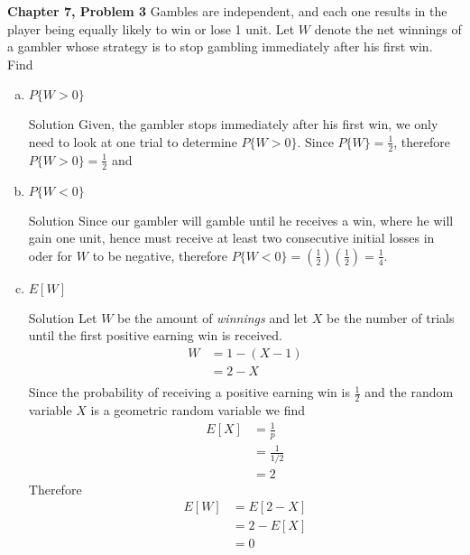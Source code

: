 \documentclass{article}
\begin{document}
\begin{spacing}{1.1}
\maketitle

\newpage
\begin{homeworkProblem}
  {\bf Chapter 7, Problem 3}
  Gambles are independent, and each one results in
  the player being equally likely to win or lose 1 unit. 
  Let $W$ denote the net winnings of a gambler whose strategy 
  is to stop gambling immediately after his first win. Find
  \begin{enumerate}[(a)]
    \item $P\{ W > 0 \}$
      \begin{homeworkSection}{Solution}
        Given, the gambler stops immediately after his
        first win, we only need to look at one trial to determine $P\{ W > 0 \}$.
        Since $P\{ W\} = \frac{ 1}{ 2}$, therefore $P\{ W > 0\} = \frac{ 1}{ 2}$ and 
      \end{homeworkSection}
    \item $P\{ W < 0 \}$
      \begin{homeworkSection}{Solution}
        Since our gambler will gamble until he receives a win, where he will gain
        one unit, hence must receive at least two consecutive initial losses in
        oder for $W$ to be negative, therefore
        $P\{ W < 0 \} = \left(\frac{ 1}{ 2}\right)\left(\frac{ 1}{ 2}\right) = \frac{ 1}{ 4}$.
      \end{homeworkSection}
    \item $E[ W]$
      \begin{homeworkSection}{Solution}
        Let $W$ be the amount of \emph{winnings} and let $X$ be the number of trials until the
        first positive earning win is received.
        \begin{align*}
          W &= 1 - (X - 1)\\
          &= 2 - X\\
        \end{align*}
        Since the probability of receiving a positive earning win is $\frac{ 1}{ 2}$ and the
        random variable $X$ is a geometric random variable we find
        \begin{align*}
          E[ X] &= \frac{ 1}{ p}\\ 
          &= \frac{ 1}{ 1/2} \\
          &= 2
        \end{align*}
        Therefore
        \begin{align*}
          E[ W] &= E[ 2 - X]\\
          &= 2 - E[ X]\\
          &= 0
        \end{align*}
      \end{homeworkSection}
  \end{enumerate}
\end{homeworkProblem}


\end{spacing}
\end{document}
